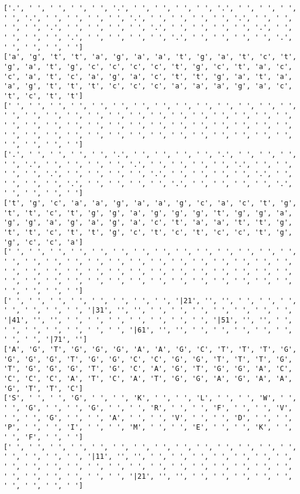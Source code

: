 \documentclass{article}
\begin{document}
\begin{Verbatim}
['.', ' ', ' ', ' ', ' ', '.', ' ', ' ', ' ', ' ', '.', ' ', ' ', ' ', ' ', '.', ' ', ' ', ' ', ' ', '.', ' ', ' ', ' ', ' ', '.', ' ', ' ', ' ', ' ', '.', ' ', ' ', ' ', ' ', '.', ' ', ' ', ' ', ' ', '.', ' ', ' ', ' ', ' ', '.', ' ', ' ', ' ', ' ', '.', ' ', ' ', ' ', ' ', '.', ' ', ' ', ' ', ' ']
['a', 'g', 't', 't', 'a', 'g', 'a', 'a', 't', 'g', 'a', 't', 'c', 't', 'g', 'a', 't', 'g', 'c', 'c', 'c', 'c', 't', 'g', 'c', 't', 'a', 'c', 'c', 'a', 't', 'c', 'a', 'g', 'a', 'c', 't', 't', 'g', 'a', 't', 'a', 'a', 'g', 't', 't', 't', 'c', 'c', 'c', 'a', 'a', 'a', 'g', 'a', 'c', 't', 'c', 't', 't']
[' ', ' ', ' ', ' ', ' ', ' ', ' ', ' ', ' ', ' ', ' ', ' ', ' ', ' ', ' ', ' ', ' ', ' ', ' ', ' ', ' ', ' ', ' ', ' ', ' ', ' ', ' ', ' ', ' ', ' ', ' ', ' ', ' ', ' ', ' ', ' ', ' ', ' ', ' ', ' ', ' ', ' ', ' ', ' ', ' ', ' ', ' ', ' ', ' ', ' ', ' ', ' ', ' ', ' ', ' ', ' ', ' ', ' ', ' ', ' ']
['.', ' ', ' ', ' ', ' ', '.', ' ', ' ', ' ', ' ', '.', ' ', ' ', ' ', ' ', '.', ' ', ' ', ' ', ' ', '.', ' ', ' ', ' ', ' ', '.', ' ', ' ', ' ', ' ', '.', ' ', ' ', ' ', ' ', '.', ' ', ' ', ' ', ' ', '.', ' ', ' ', ' ', ' ', '.', ' ', ' ', ' ', ' ', '.', ' ', ' ', ' ', ' ', '.', ' ', ' ', ' ', ' ']
['t', 'g', 'c', 'a', 'a', 'g', 'a', 'a', 'g', 'c', 'a', 'c', 't', 'g', 't', 't', 'c', 't', 'g', 'g', 'a', 'g', 'g', 'g', 't', 'g', 'g', 'a', 'g', 'g', 'a', 'g', 'a', 'g', 'a', 'c', 't', 'a', 'a', 't', 't', 'g', 't', 't', 'c', 't', 't', 'g', 'c', 't', 'c', 't', 'c', 'c', 't', 'g', 'g', 'c', 'c', 'a']
[' ', ' ', ' ', ' ', ' ', ' ', ' ', ' ', ' ', ' ', ' ', ' ', ' ', ' ', ' ', ' ', ' ', ' ', ' ', ' ', ' ', ' ', ' ', ' ', ' ', ' ', ' ', ' ', ' ', ' ', ' ', ' ', ' ', ' ', ' ', ' ', ' ', ' ', ' ', ' ', ' ', ' ', ' ', ' ', ' ', ' ', ' ', ' ', ' ', ' ', ' ', ' ', ' ', ' ', ' ', ' ', ' ', ' ', ' ', ' ']
[' ', ' ', ' ', ' ', ' ', ' ', ' ', ' ', '|21', '', '', ' ', ' ', ' ', ' ', ' ', ' ', ' ', '|31', '', '', ' ', ' ', ' ', ' ', ' ', ' ', ' ', '|41', '', '', ' ', ' ', ' ', ' ', ' ', ' ', ' ', '|51', '', '', ' ', ' ', ' ', ' ', ' ', ' ', ' ', '|61', '', '', ' ', ' ', ' ', ' ', ' ', ' ', ' ', '|71', '']
['A', 'G', 'T', 'G', 'G', 'G', 'A', 'A', 'G', 'C', 'T', 'T', 'T', 'G', 'G', 'G', 'G', 'T', 'G', 'G', 'C', 'C', 'G', 'G', 'T', 'T', 'T', 'G', 'T', 'G', 'G', 'G', 'T', 'G', 'C', 'A', 'G', 'T', 'G', 'G', 'A', 'C', 'C', 'C', 'C', 'A', 'T', 'C', 'A', 'T', 'G', 'G', 'A', 'G', 'A', 'A', 'G', 'T', 'T', 'C']
['S', ' ', ' ', 'G', ' ', ' ', 'K', ' ', ' ', 'L', ' ', ' ', 'W', ' ', ' ', 'G', ' ', ' ', 'G', ' ', ' ', 'R', ' ', ' ', 'F', ' ', ' ', 'V', ' ', ' ', 'G', ' ', ' ', 'A', ' ', ' ', 'V', ' ', ' ', 'D', ' ', ' ', 'P', ' ', ' ', 'I', ' ', ' ', 'M', ' ', ' ', 'E', ' ', ' ', 'K', ' ', ' ', 'F', ' ', ' ']
[' ', ' ', ' ', ' ', ' ', ' ', ' ', ' ', ' ', ' ', ' ', ' ', ' ', ' ', ' ', ' ', ' ', ' ', '|11', '', '', ' ', ' ', ' ', ' ', ' ', ' ', ' ', ' ', ' ', ' ', ' ', ' ', ' ', ' ', ' ', ' ', ' ', ' ', ' ', ' ', ' ', ' ', ' ', ' ', ' ', ' ', ' ', '|21', '', '', ' ', ' ', ' ', ' ', ' ', ' ', ' ', ' ', ' ']
  

\end{Verbatim}
\end{document}
